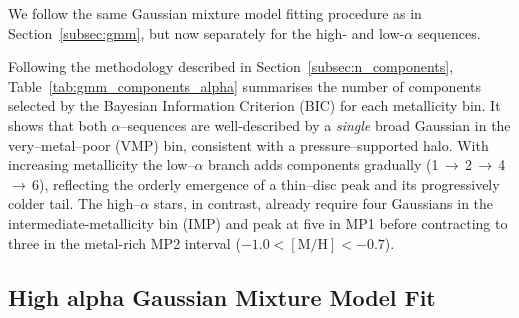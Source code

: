 \documentclass[a4paper,12pt]{article}
\begin{document}
We follow the same Gaussian mixture model fitting procedure as in
Section~\ref{subsec:gmm}, but now separately for the high- and low-$\alpha$ sequences.

\begin{table}[H]
  \centering
  \caption{Number of Gaussian Mixture components selected by the BIC for each metallicity bin, split by $\alpha$-sequence.}
    \label{tab:gmm_components_alpha}
\end{table}

Following the methodology described in Section~\ref{subsec:n_components}, Table~\ref{tab:gmm_components_alpha} summarises the number of components selected by the Bayesian Information Criterion (BIC) for each metallicity bin.
It shows that both $\alpha$–sequences are well-described by a \emph{single} broad Gaussian in the very–metal–poor (VMP) bin, consistent with a pressure–supported halo.  
With increasing metallicity the low–$\alpha$ branch adds components gradually (1\,$\rightarrow$\,2\,$\rightarrow$\,4\,$\rightarrow$\,6), reflecting the orderly emergence of a thin–disc peak and its progressively colder tail.  
The high–$\alpha$ stars, in contrast, already require four Gaussians in the intermediate-metallicity bin (IMP) and peak at five in MP1 before contracting to three in the metal-rich MP2 interval ($-1.0<\mathrm{[M/H]}<-0.7$).


\subsection{High alpha Gaussian Mixture Model Fit}
\end{document}
